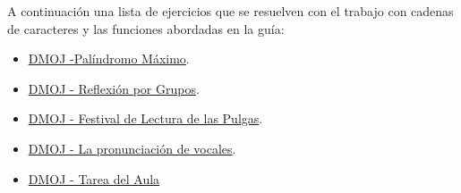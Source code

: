 A continuación una lista de ejercicios que se resuelven con el trabajo con cadenas de caracteres y las funciones abordadas en la guía:

\begin{itemize}
	\item \href{https://dmoj.uclv.edu.cu/problem/maxpalind} {DMOJ -Palíndromo Máximo}. 
	\item \href{https://dmoj.uclv.edu.cu/problem/greflexion} {DMOJ - Reflexión por Grupos}.
	\item \href{https://dmoj.uclv.edu.cu/problem/festp} {DMOJ - Festival de Lectura de las Pulgas}.
	\item \href{https://dmoj.uclv.edu.cu/problem/cad} {DMOJ - La pronunciación de vocales}.
	\item \href{https://dmoj.uclv.edu.cu/problem/buka}{DMOJ - Tarea del Aula}
\end{itemize}